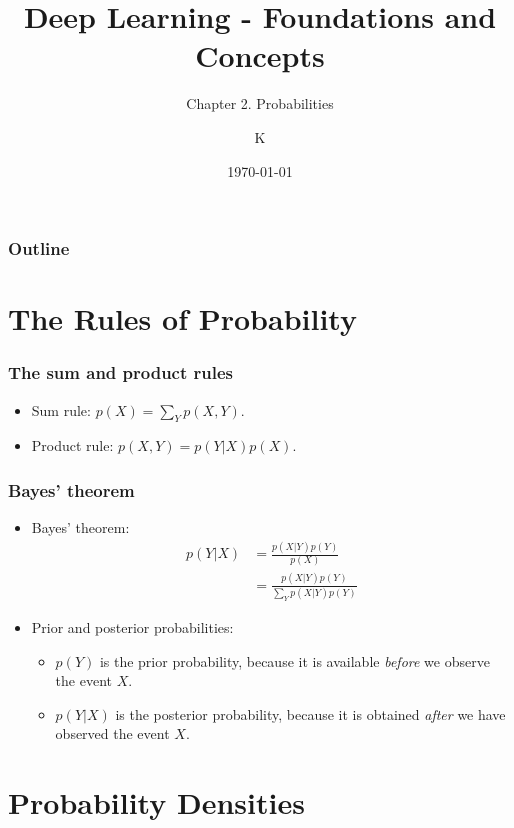 \documentclass{beamer}
\title{Deep Learning - Foundations and Concepts}
\subtitle{Chapter 2. Probabilities}
\author{K}
\date{\today}
\begin{document}
\begin{frame}
    \titlepage
\end{frame}

\begin{frame}
    \frametitle{Outline}
    \tableofcontents
\end{frame}

\section{The Rules of Probability}

\begin{frame}
    \frametitle{The sum and product rules}
    \begin{itemize}
        \item Sum rule: $p(X)=\sum_{Y}p(X,Y)$.
        \item Product rule: $p(X,Y)=p(Y|X)p(X)$.
    \end{itemize}
\end{frame}

\begin{frame}
    \frametitle{Bayes' theorem}
    \begin{itemize}
        \item Bayes' theorem:
        \begin{align*}
            p(Y|X)&=\frac{p(X|Y)p(Y)}{p(X)} \\
            &=\frac{p(X|Y)p(Y)}{\sum_{Y}p(X|Y)p(Y)}
        \end{align*}
        \item Prior and posterior probabilities:
        \begin{itemize}
            \item $p(Y)$ is the prior probability, because it is available \emph{before} we observe the event $X$.
            \item $p(Y|X)$ is the posterior probability, because it is obtained \emph{after} we have observed the event $X$.
        \end{itemize}
    \end{itemize}
\end{frame}

\section{Probability Densities}
\end{document}
